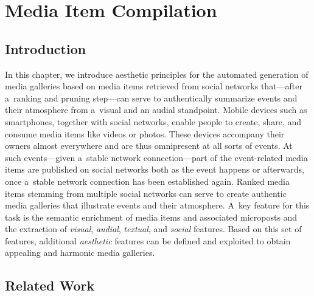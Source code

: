 \chapter{Media Item Compilation}
\label{cha:media-item-compilation}

\ifpdf
    \graphicspath{{9_media_item_compilation/figures/PNG/}{9_media_item_compilation/figures/PDF/}{9_media_item_compilation/figures/}}
\else
    \graphicspath{{9_media_item_compilation/figures/EPS/}{9_media_item_compilation/figures/}}
\fi

\section{Introduction}

In this chapter, we introduce aesthetic principles
for the automated generation of media galleries
based on media items retrieved from social networks
that---after a~ranking and pruning step---can serve to authentically
summarize events and their atmosphere from a~visual
and an audial standpoint.
Mobile devices such as smartphones, together with social networks,
enable people to create, share, and consume media items
like videos or photos.
These devices accompany their owners almost everywhere
and are thus omnipresent at all sorts of events.
At such events---given a~stable network connection---part of
the event-related media items are published on social networks
both as the event happens or afterwards,
once a~stable network connection has been established again.
Ranked media items stemming from multiple social networks
can serve to create authentic media galleries
that illustrate events and their atmosphere.
A~key feature for this task is the semantic enrichment
of media items and associated microposts
and the extraction of \emph{visual}, \emph{audial},
\emph{textual}, and \emph{social} features.
Based on this set of features,
additional \emph{aesthetic} features
can be defined and exploited to obtain appealing
and harmonic media galleries.

\section{Related Work}

